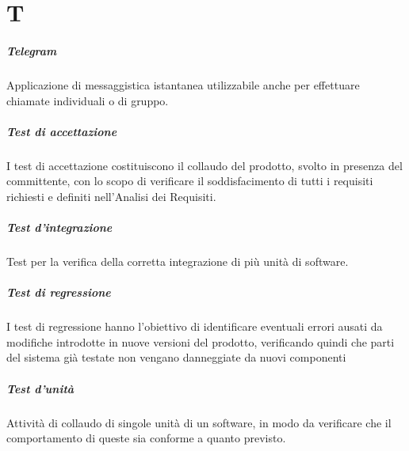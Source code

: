 \chapter{T}

\paragraph*{Telegram}
Applicazione di messaggistica istantanea utilizzabile anche per effettuare chiamate individuali o di gruppo.

\paragraph*{Test di accettazione}
I test di accettazione costituiscono il collaudo del prodotto, svolto in presenza del committente, con lo scopo di verificare il
soddisfacimento di tutti i requisiti richiesti e definiti nell'Analisi dei Requisiti.

\paragraph*{Test d'integrazione}
Test per la verifica della corretta integrazione di più unità di software.

\paragraph*{Test di regressione}
I test di regressione hanno l'obiettivo di identificare eventuali errori ausati da modifiche introdotte in nuove versioni del
prodotto, verificando quindi che parti del sistema già testate non vengano danneggiate da nuovi componenti

\paragraph*{Test d'unità}
Attività di collaudo di singole unità di un software, in modo da verificare che il comportamento di queste sia conforme a quanto previsto.
